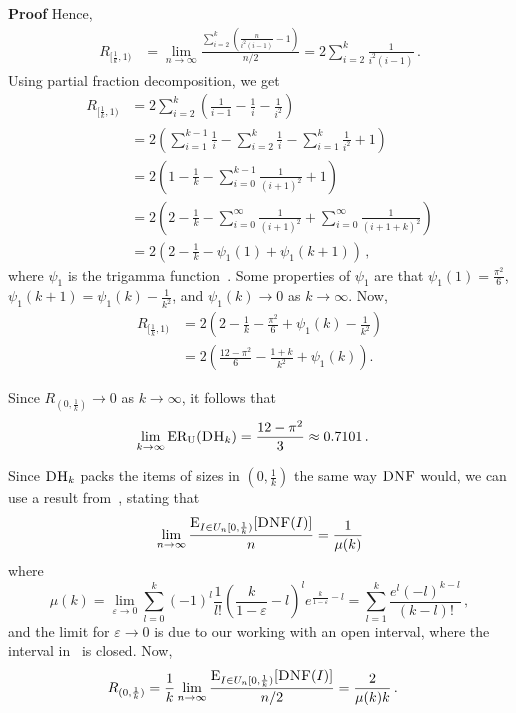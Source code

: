 \documentclass[11pt]{article}
\newenvironment{proof}{\begin{trivlist}\item[]{\bf Proof }}{\hspace*{\fill}\raisebox{-1pt}{\boldmath$\Box$}\end{trivlist}}
\newcommand{\DNF}{\ensuremath{\operatorname{\textsc{DNF}}}\xspace}
\newcommand{\DHk}{{\ensuremath{\textsc{DH}_k}}\xspace}
\newcommand{\EXPDIST}[2]{\ensuremath{\operatorname{E}_{#1}[#2]}}
\newcommand{\RDNF}{\ensuremath{R_{(0,\frac{1}{k})}}\xspace}
\newcommand{\RHar}{\ensuremath{R_{[\frac{1}{k},1)}}\xspace}
\newcommand{\gf}{\ensuremath{\psi_1}\xspace}
\newcommand{\ERU}[1]{\ensuremath{\mathrm{ER_U}(#1)}\xspace}
\begin{document}
\begin{proof}
Hence,
 \begin{align*}
   \RHar
 & = \lim_{n \rightarrow \infty} 
     \frac{\sum\limits_{i=2}^k \left(\frac{n}{i^2(i-1)}-1\right)}
          {n/2}
   = 2 \sum\limits_{i=2}^k \frac{1}{i^2(i-1)}\,.
 \end{align*}
Using partial fraction decomposition, we get
 \begin{align*}
   \RHar
 & = 2 \sum\limits_{i=2}^k  \left(\frac{1}{i-1} - \frac{1}{i} -
     \frac{1}{i^2}\right)\\ 
 & = 2 \left( \sum\limits_{i=1}^{k-1}\frac{1}{i} -  
     \sum\limits_{i=2}^k \frac{1}{i} -
     \sum\limits_{i=1}^k \frac{1}{i^2} + 1 \right) \\
 & = 2 \left( 1 - \frac{1}{k} - 
     \sum\limits_{i=0}^{k-1}\frac{1}{(i+1)^2} + 1 \right) \\
 & = 2 \left( 2 - \frac{1}{k} - 
     \sum\limits_{i=0}^\infty \frac{1}{(i+1)^2} +
     \sum\limits_{i=0}^\infty \frac{1}{(i+1+k)^2} \right)\\
 & = 2 \left( 2 - \frac{1}{k} - \gf(1) + \gf(k+1) \right)\,,
 \end{align*}
 where \gf is the trigamma function~\cite{AS64b}.
Some properties of \gf are that $\gf(1)=\frac{\pi^2}{6}$, $\gf(k+1)
 = \gf(k)- \frac{1}{k^2}$, and $\gf(k) \rightarrow 0$ as $k
 \rightarrow \infty$.
Now,
 \begin{align*}
   \RHar
 & = 2\left(2 - \frac{1}{k} - \frac{\pi^2}{6} + \gf(k)-\frac{1}{k^2}\right)\\
 & = 2\left(\frac{12-\pi^2}{6} - \frac{1+k}{k^2} + \gf(k)\right).
 \end{align*}

Since $\RDNF \rightarrow 0$ as $k \rightarrow \infty$, it follows that 
 \begin{align*}
     \lim_{k \rightarrow \infty} \ERU{\DHk}
 & = \frac{12-\pi^2}{3} \approx 0.7101\,.
 \end{align*}

Since \DHk packs the items of sizes in $(0,\frac{1}{k})$ the same
way \DNF would,
we can use a result from~\cite{CFGK91}, stating that
\[
\lim\limits_{n\rightarrow\infty}
  \frac{\EXPDIST{I\in U_n[0,\frac{1}{k})}{\DNF(I)}}{n}
=
\frac{1}{\mu(k)}
\]
where
 $$\mu(k) 
 = \lim\limits_{\varepsilon \rightarrow 0}
   \sum\limits_{l=0}^k (-1)^l \frac{1}{l!}
      \left( \frac{k}{1-\varepsilon} - l \right)^l
      e^{\frac{k}{1-\varepsilon} -l}
 = \sum\limits_{l=1}^{k}  \frac{e^l (-l)^{k-l}}{(k-l)!}\,,$$
and the limit for $\varepsilon\rightarrow 0$ is due to our working with
an open interval, where the interval in~\cite[Eq.~(28)]{CFGK91} is closed.
Now,
 \begin{align*}
   \RDNF 
 & = \frac{1}{k}
     \lim\limits_{n\rightarrow\infty}
     \frac{\EXPDIST{I\in U_n[0,\frac{1}{k})}{\DNF(I)}}{n/2}
   = \frac{2}{\mu(k) k}\,.
 \end{align*}


\end{proof}
\end{document}
